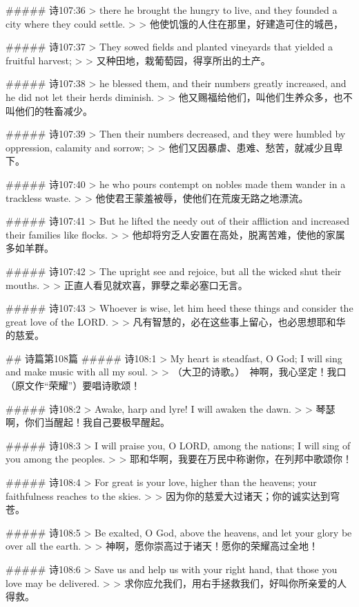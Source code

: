 ##### 诗107:36
> there he brought the hungry to live, and they founded a city where they could settle.
>
> 他使饥饿的人住在那里，好建造可住的城邑，


##### 诗107:37
> They sowed fields and planted vineyards that yielded a fruitful harvest;
>
> 又种田地，栽葡萄园，得享所出的土产。


##### 诗107:38
> he blessed them, and their numbers greatly increased, and he did not let their herds diminish.
>
> 他又赐福给他们，叫他们生养众多，也不叫他们的牲畜减少。


##### 诗107:39
> Then their numbers decreased, and they were humbled by oppression, calamity and sorrow;
>
> 他们又因暴虐、患难、愁苦，就减少且卑下。


##### 诗107:40
> he who pours contempt on nobles made them wander in a trackless waste.
>
> 他使君王蒙羞被辱，使他们在荒废无路之地漂流。


##### 诗107:41
> But he lifted the needy out of their affliction and increased their families like flocks.
>
> 他却将穷乏人安置在高处，脱离苦难，使他的家属多如羊群。


##### 诗107:42
> The upright see and rejoice, but all the wicked shut their mouths.
>
> 正直人看见就欢喜，罪孽之辈必塞口无言。


##### 诗107:43
> Whoever is wise, let him heed these things and consider the great love of the LORD.
>
> 凡有智慧的，必在这些事上留心，也必思想耶和华的慈爱。


## 诗篇第108篇
##### 诗108:1
> My heart is steadfast, O God; I will sing and make music with all my soul.
>
> （大卫的诗歌。）　神啊，我心坚定！我口（原文作“荣耀”）要唱诗歌颂！


##### 诗108:2
> Awake, harp and lyre! I will awaken the dawn.
>
> 琴瑟啊，你们当醒起！我自己要极早醒起。


##### 诗108:3
> I will praise you, O LORD, among the nations; I will sing of you among the peoples.
>
> 耶和华啊，我要在万民中称谢你，在列邦中歌颂你！


##### 诗108:4
> For great is your love, higher than the heavens; your faithfulness reaches to the skies.
>
> 因为你的慈爱大过诸天；你的诚实达到穹苍。


##### 诗108:5
> Be exalted, O God, above the heavens, and let your glory be over all the earth.
>
> 神啊，愿你崇高过于诸天！愿你的荣耀高过全地！


##### 诗108:6
> Save us and help us with your right hand, that those you love may be delivered.
>
> 求你应允我们，用右手拯救我们，好叫你所亲爱的人得救。


